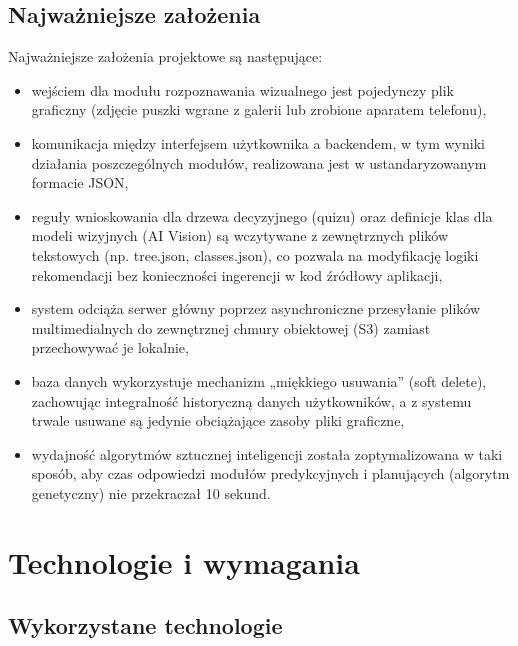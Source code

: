 \documentclass[12pt,a4paper]{article}
\begin{document}
\subsection{Najważniejsze założenia}
Najważniejsze założenia projektowe są następujące:
\begin{itemize}
    \item wejściem dla modułu rozpoznawania wizualnego jest pojedynczy plik graficzny (zdjęcie puszki wgrane z galerii lub zrobione aparatem telefonu),
    \item komunikacja między interfejsem użytkownika a backendem, w tym wyniki działania poszczególnych modułów, realizowana jest w ustandaryzowanym formacie JSON,
    \item reguły wnioskowania dla drzewa decyzyjnego (quizu) oraz definicje klas dla modeli wizyjnych (AI Vision) są wczytywane z zewnętrznych plików tekstowych (np. tree.json, classes.json), co pozwala na modyfikację logiki rekomendacji bez konieczności ingerencji w kod źródłowy aplikacji,
    \item system odciąża serwer główny poprzez asynchroniczne przesyłanie plików multimedialnych do zewnętrznej chmury obiektowej (S3) zamiast przechowywać je lokalnie,
    \item baza danych wykorzystuje mechanizm „miękkiego usuwania” (soft delete), zachowując integralność historyczną danych użytkowników, a z systemu trwale usuwane są jedynie obciążające zasoby pliki graficzne,
    \item wydajność algorytmów sztucznej inteligencji została zoptymalizowana w taki sposób, aby czas odpowiedzi modułów predykcyjnych i planujących (algorytm genetyczny) nie przekraczał 10 sekund.
\end{itemize}

\section{Technologie i wymagania}
\subsection{Wykorzystane technologie}
\end{document}
